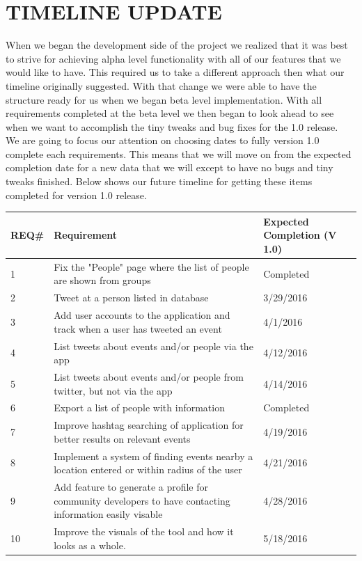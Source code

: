 \documentclass[letterpaper,10pt,onecolumn]{IEEEtran} %
\begin{document}
\section{TIMELINE UPDATE}
When we began the development side of the project we realized that it was best
to strive for achieving alpha level functionality with all of our features that
we would like to have. This required us to take a different approach then what
our timeline originally suggested. With that change we were able to have the
structure ready for us when we began beta level implementation. With all
requirements completed at the beta level we then began to look ahead to see when
we want to accomplish the tiny tweaks and bug fixes for the 1.0 release. \\

We are going to focus our attention on choosing dates to fully version 1.0
complete each requirements. This means that we will move on from the expected
completion date for a new data that we will except to have no bugs and tiny
tweaks finished. Below shows our future timeline for getting these items
completed for version 1.0 release. \\



\begin{center}
\begin{tabular}{ | m{1cm} | m{7cm}| m{4cm} | } 
\hline
REQ\# & Requirement & Expected Completion (V 1.0) \\ 
\hline
1 & Fix the "People" page where the list of people are shown from groups & Completed \\ 
\hline
2 & Tweet at a person listed in database & 3/29/2016 \\ 
\hline
3 & Add user accounts to the application and track when a user has tweeted an event & 4/1/2016 \\ 
\hline
4 & List tweets about events and/or people via the app & 4/12/2016 \\ 
\hline
5 & List tweets about events and/or people from twitter, but not via the app & 4/14/2016 \\ 
\hline
6 & Export a list of people with information & Completed \\ 
\hline
7 & Improve hashtag searching of application for better results on relevant events & 4/19/2016 \\ 
\hline
8 & Implement a system of finding events nearby a location entered or within radius of the user & 4/21/2016 \\ 
\hline
9 & Add feature to generate a profile for community developers to have contacting information easily visable & 4/28/2016 \\ 
\hline
10 & Improve the visuals of the tool and how it looks as a whole. & 5/18/2016 \\ 
\hline
\end{tabular}
\end{center}
\end{document}
